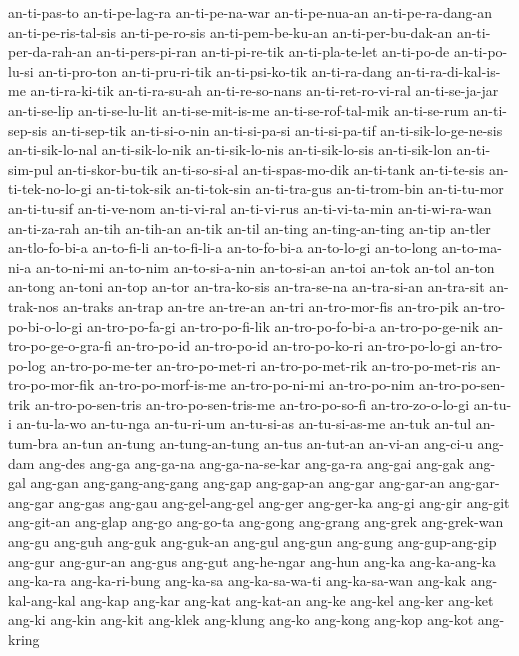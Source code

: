 {an-ti-pas-to an-ti-pe-lag-ra an-ti-pe-na-war an-ti-pe-nua-an
an-ti-pe-ra-dang-an an-ti-pe-ris-tal-sis an-ti-pe-ro-sis
an-ti-pem-be-ku-an an-ti-per-bu-dak-an an-ti-per-da-rah-an
an-ti-pers-pi-ran an-ti-pi-re-tik an-ti-pla-te-let an-ti-po-de
an-ti-po-lu-si an-ti-pro-ton an-ti-pru-ri-tik an-ti-psi-ko-tik
an-ti-ra-dang an-ti-ra-di-kal-is-me an-ti-ra-ki-tik an-ti-ra-su-ah
an-ti-re-so-nans an-ti-ret-ro-vi-ral an-ti-se-ja-jar an-ti-se-lip
an-ti-se-lu-lit an-ti-se-mit-is-me an-ti-se-rof-tal-mik an-ti-se-rum
an-ti-sep-sis an-ti-sep-tik an-ti-si-o-nin an-ti-si-pa-si an-ti-si-pa-tif
an-ti-sik-lo-ge-ne-sis an-ti-sik-lo-nal an-ti-sik-lo-nik an-ti-sik-lo-nis
an-ti-sik-lo-sis an-ti-sik-lon an-ti-sim-pul an-ti-skor-bu-tik
an-ti-so-si-al an-ti-spas-mo-dik an-ti-tank an-ti-te-sis
an-ti-tek-no-lo-gi an-ti-tok-sik an-ti-tok-sin an-ti-tra-gus
an-ti-trom-bin an-ti-tu-mor an-ti-tu-sif an-ti-ve-nom an-ti-vi-ral
an-ti-vi-rus an-ti-vi-ta-min an-ti-wi-ra-wan an-ti-za-rah an-tih an-tih-an
an-tik an-til an-ting an-ting-an-ting an-tip an-tler an-tlo-fo-bi-a
an-to-fi-li an-to-fi-li-a an-to-fo-bi-a an-to-lo-gi an-to-long
an-to-ma-ni-a an-to-ni-mi an-to-nim an-to-si-a-nin an-to-si-an an-toi
an-tok an-tol an-ton an-tong an-toni an-top an-tor an-tra-ko-sis
an-tra-se-na an-tra-si-an an-tra-sit an-trak-nos an-traks an-trap an-tre
an-tre-an an-tri an-tro-mor-fis an-tro-pik an-tro-po-bi-o-lo-gi
an-tro-po-fa-gi an-tro-po-fi-lik an-tro-po-fo-bi-a an-tro-po-ge-nik
an-tro-po-ge-o-gra-fi an-tro-po-id an-tro-po-id an-tro-po-ko-ri
an-tro-po-lo-gi an-tro-po-log an-tro-po-me-ter an-tro-po-met-ri
an-tro-po-met-rik an-tro-po-met-ris an-tro-po-mor-fik an-tro-po-morf-is-me
an-tro-po-ni-mi an-tro-po-nim an-tro-po-sen-trik an-tro-po-sen-tris
an-tro-po-sen-tris-me an-tro-po-so-fi an-tro-zo-o-lo-gi an-tu-i
an-tu-la-wo an-tu-nga an-tu-ri-um an-tu-si-as an-tu-si-as-me an-tuk an-tul
an-tum-bra an-tun an-tung an-tung-an-tung an-tus an-tut-an an-vi-an
ang-ci-u ang-dam ang-des ang-ga ang-ga-na ang-ga-na-se-kar ang-ga-ra
ang-gai ang-gak ang-gal ang-gan ang-gang-ang-gang ang-gap ang-gap-an
ang-gar ang-gar-an ang-gar-ang-gar ang-gas ang-gau ang-gel-ang-gel ang-ger
ang-ger-ka ang-gi ang-gir ang-git ang-git-an ang-glap ang-go ang-go-ta
ang-gong ang-grang ang-grek ang-grek-wan ang-gu ang-guh ang-guk ang-guk-an
ang-gul ang-gun ang-gung ang-gup-ang-gip ang-gur ang-gur-an ang-gus
ang-gut ang-he-ngar ang-hun ang-ka ang-ka-ang-ka ang-ka-ra ang-ka-ri-bung
ang-ka-sa ang-ka-sa-wa-ti ang-ka-sa-wan ang-kak ang-kal-ang-kal ang-kap
ang-kar ang-kat ang-kat-an ang-ke ang-kel ang-ker ang-ket ang-ki ang-kin
ang-kit ang-klek ang-klung ang-ko ang-kong ang-kop ang-kot ang-kring
}
